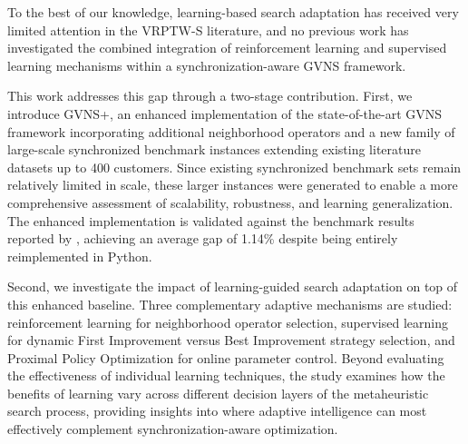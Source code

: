To the best of our knowledge, learning-based search adaptation has received very limited attention in the VRPTW-S literature, and no previous work has investigated the combined integration of reinforcement learning and supervised learning mechanisms within a synchronization-aware GVNS framework.

This work addresses this gap through a two-stage contribution. First, we introduce GVNS+, an enhanced implementation of the state-of-the-art GVNS framework incorporating additional neighborhood operators and a new family of large-scale synchronized benchmark instances extending existing literature datasets up to 400 customers. Since existing synchronized benchmark sets remain relatively limited in scale, these larger instances were generated to enable a more comprehensive assessment of scalability, robustness, and learning generalization. The enhanced implementation is validated against the benchmark results reported by \citet{masmoudi2025generalized}, achieving an average gap of 1.14\% despite being entirely reimplemented in Python.

Second, we investigate the impact of learning-guided search adaptation on top of this enhanced baseline. Three complementary adaptive mechanisms are studied: reinforcement learning for neighborhood operator selection, supervised learning for dynamic First Improvement versus Best Improvement strategy selection, and Proximal Policy Optimization for online parameter control. Beyond evaluating the effectiveness of individual learning techniques, the study examines how the benefits of learning vary across different decision layers of the metaheuristic search process, providing insights into where adaptive intelligence can most effectively complement synchronization-aware optimization.